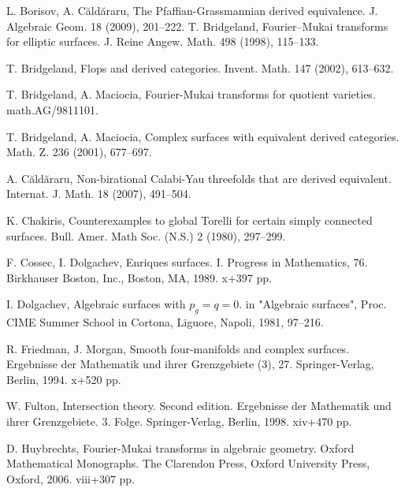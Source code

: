 \documentclass[a4paper,11pt]{article}
\theoremstyle{definition}\newtheorem{defn}[thm]{Definition}
\theoremstyle{remark}\newtheorem{remark}[thm]{Remark}
\numberwithin{equation}{section}
\begin{document}
\indent\begin{thebibliography}{Fri95}

L. Borisov, A. C\u{a}ld\u{a}raru, 
The Pfaffian-Grassmannian derived equivalence. J. Algebraic Geom. 18 (2009),
201--222. 
T. Bridgeland, Fourier--Mukai transforms for elliptic surfaces. J. Reine Angew. Math. 498 (1998), 115--133. 

T. Bridgeland, Flops and derived categories. Invent. Math. 147 (2002), 613--632. 

T. Bridgeland, A. Maciocia,
Fourier-Mukai transforms for quotient varieties. math.AG/9811101.

T. Bridgeland, A. Maciocia,
Complex surfaces with equivalent
 derived categories. Math. Z. 236 (2001), 677--697. 


A. C\u{a}ld\u{a}raru,
Non-birational Calabi-Yau threefolds that are derived equivalent.
Internat. J. Math. 18 (2007), 491--504. 


K. Chakiris,
Counterexamples to global Torelli for certain simply connected surfaces.
Bull. Amer. Math Soc. (N.S.) 2 (1980), 297--299.

F. Cossec, I. Dolgachev,
 Enriques surfaces. I. Progress in Mathematics, 76. Birkhauser Boston, Inc., 
Boston, MA, 1989. x+397 pp.

I. Dolgachev,
Algebraic surfaces with $p_g=q=0$. in "Algebraic surfaces", 
Proc. CIME Summer School in Cortona, Liguore, Napoli, 1981, 97--216.




R. Friedman, J. Morgan, Smooth four-manifolds and complex surfaces. 
Ergebnisse der Mathematik und ihrer Grenzgebiete (3),
27. Springer-Verlag, Berlin, 1994. x+520 pp.
 
 
W. Fulton, Intersection theory. Second edition. 
Ergebnisse der Mathematik und ihrer Grenzgebiete. 3. Folge. 
 Springer-Verlag, Berlin, 1998. xiv+470 pp.

D. Huybrechts, Fourier-Mukai transforms in algebraic geometry.
 Oxford Mathematical Monographs. The Clarendon Press, 
 Oxford University Press, Oxford, 2006. viii+307 pp.
 

\end{thebibliography}
\end{document}
